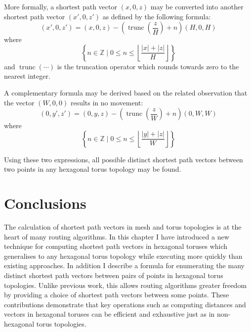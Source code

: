 			More formally, a shortest path vector $(x, 0, z)$ may be converted into
			another shortest path vector $(x', 0, z')$ as defined by the following
			formula:
			\begin{equation*}
				(x', 0, z') = (x, 0, z) - \left(\operatorname{trunc}\left(\frac{z}{H}\right) + n\right)(H, 0, H)
			\end{equation*}
			where
			\begin{equation*}
				\left\{
					n \in \mathbb{Z}
				\;\Big|\;
					0 \le n \le
						\left\lfloor
							\frac{\left|x\right| + \left|z\right|}{H}
						\right\rfloor
				\right\}
			\end{equation*}
			and $\operatorname{trunc}(\cdots)$ is the truncation operator which
			rounds towards zero to the nearest integer.
			
			A complementary formula may be derived based on the related observation
			that the vector $(W, 0, 0)$ results in no movement:
			\begin{equation*}
				(0, y', z') = (0, y, z) - \left(\operatorname{trunc}\left(\frac{z}{W}\right) + n\right)(0, W, W)
			\end{equation*}
			where
			\begin{equation*}
				\left\{
					n \in \mathbb{Z}
				\;\Big|\;
					0 \le n \le
						\left\lfloor
							\frac{\left|y\right| + \left|z\right|}{W}
						\right\rfloor
				\right\}
			\end{equation*}
			
			Using these two expressions, all possible distinct shortest path vectors
			between two points in any hexagonal torus topology may be found.
	
	\section{Conclusions}
		
		The calculation of shortest path vectors in mesh and torus topologies is at
		the heart of many routing algorithms. In this chapter I have introduced a
		new technique for computing shortest path vectors in hexagonal toruses
		which generalises to any hexagonal torus topology while executing more
		quickly than existing approaches. In addition I describe a formula for
		enumerating the many distinct shortest path vectors between pairs of points
		in hexagonal torus topologies. Unlike previous work, this allows routing
		algorithms greater freedom by providing a choice of shortest path vectors
		between some points. These contributions demonstrate that key operations
		such as computing distances and vectors in hexagonal toruses can be
		efficient and exhaustive just as in non-hexagonal torus topologies.
